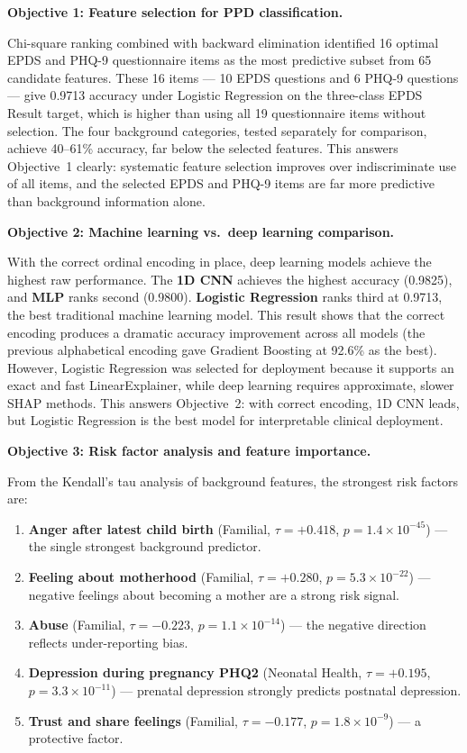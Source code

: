\textbf{Objective 1: Feature selection for PPD classification.}

Chi-square ranking combined with backward elimination identified 16 optimal EPDS and PHQ-9 questionnaire items as the most predictive subset from 65 candidate features.
These 16 items --- 10 EPDS questions and 6 PHQ-9 questions --- give 0.9713 accuracy under Logistic Regression on the three-class EPDS Result target, which is higher than using all 19 questionnaire items without selection.
The four background categories, tested separately for comparison, achieve 40--61\% accuracy, far below the selected features.
This answers Objective~1 clearly: systematic feature selection improves over indiscriminate use of all items, and the selected EPDS and PHQ-9 items are far more predictive than background information alone.

\textbf{Objective 2: Machine learning vs.\ deep learning comparison.}

With the correct ordinal encoding in place, deep learning models achieve the highest raw performance.
The \textbf{1D CNN} achieves the highest accuracy (0.9825), and \textbf{MLP} ranks second (0.9800).
\textbf{Logistic Regression} ranks third at 0.9713, the best traditional machine learning model.
This result shows that the correct encoding produces a dramatic accuracy improvement across all models (the previous alphabetical encoding gave Gradient Boosting at 92.6\% as the best).
However, Logistic Regression was selected for deployment because it supports an exact and fast LinearExplainer, while deep learning requires approximate, slower SHAP methods.
This answers Objective~2: with correct encoding, 1D CNN leads, but Logistic Regression is the best model for interpretable clinical deployment.

\textbf{Objective 3: Risk factor analysis and feature importance.}

From the Kendall's tau analysis of background features, the strongest risk factors are:
\begin{enumerate}
    \item \textbf{Anger after latest child birth} (Familial, $\tau = +0.418$, $p = 1.4 \times 10^{-45}$) --- the single strongest background predictor.
    \item \textbf{Feeling about motherhood} (Familial, $\tau = +0.280$, $p = 5.3 \times 10^{-22}$) --- negative feelings about becoming a mother are a strong risk signal.
    \item \textbf{Abuse} (Familial, $\tau = -0.223$, $p = 1.1 \times 10^{-14}$) --- the negative direction reflects under-reporting bias.
    \item \textbf{Depression during pregnancy PHQ2} (Neonatal Health, $\tau = +0.195$, $p = 3.3 \times 10^{-11}$) --- prenatal depression strongly predicts postnatal depression.
    \item \textbf{Trust and share feelings} (Familial, $\tau = -0.177$, $p = 1.8 \times 10^{-9}$) --- a protective factor.
\end{enumerate}

